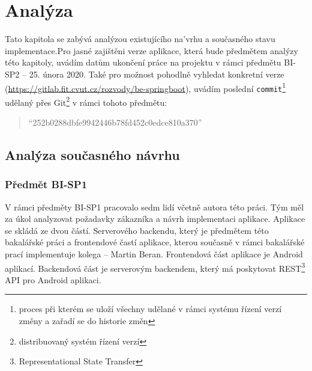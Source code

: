 \chapter{Analýza}\label{chapter:analyza}

Tato kapitola se zabývá analýzou existujícího na'vrhu a současného stavu implementace.Pro jasné zajištěni verze aplikace, která bude předmětem analýzy této kapitoly, uvádím datům ukončení práce na projektu v rámci předmětu BI-SP2 -- 25. února 2020. Také pro možnost pohodlně vyhledat konkretní verze (\url{https://gitlab.fit.cvut.cz/rozvody/be-springboot}), uvádím poslední \texttt{commit}\footnote{proces při kterém se uloží všechny udělané v rámci systému řízení verzí změny a zařadí se do historie změn} udělaný přes Git\footnote{ distribuovaný systém řízení verzí} v rámci tohoto předmětu: 
\begin{quote}
    \enquote{252b0288dbfe9942446b78fd452c0edce810a370}
\end{quote}

\section{Analýza současného návrhu} \label{analyza:analyza navrhu}
    
    \subsection{Předmět BI-SP1}\label{analyza:navrh:sp1}
    V rámci předměty BI-SP1 pracovalo sedm lidí včetně autora této práci. Tým měl za úkol analyzovat požadavky zákazníka a návrh implementaci aplikace. Aplikace se skládá ze dvou částí. Serverového backendu, který je předmětem této bakalářské práci a frontendové častí aplikace, kterou současně v rámci bakalářské prací implementuje kolega -- Martin Beran. Frontendová část aplikace je Android aplikací. Backendová část je serverovým backendem, který má poskytovat REST\footnote{Representational State Transfer} API pro Android aplikaci.
    

